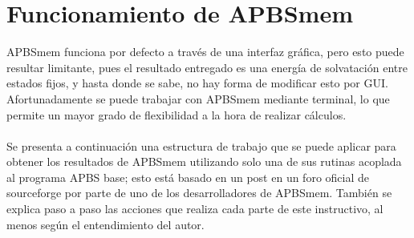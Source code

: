 \section*{Funcionamiento de APBSmem}
\noindent
APBSmem funciona por defecto a través de una interfaz gráfica, pero esto puede resultar limitante, pues el resultado entregado es una energía de solvatación entre estados fijos, y hasta donde se sabe, no hay forma de modificar esto por GUI. Afortunadamente se puede trabajar con APBSmem mediante terminal, lo que permite un mayor grado de flexibilidad a la hora de realizar cálculos.\\\\
Se presenta a continuación una estructura de trabajo que se puede aplicar para obtener los resultados de APBSmem utilizando solo una de sus rutinas acoplada al programa APBS base; esto está basado en un post en un foro oficial de sourceforge por parte de uno de los desarrolladores de APBSmem. También se explica paso a paso las acciones que realiza cada parte de este instructivo, al menos según el entendimiento del autor.

